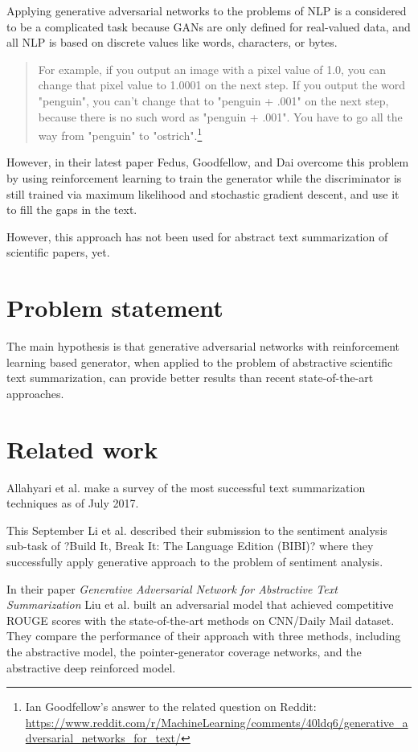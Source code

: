 \documentclass[sigplan]{acmart}
\begin{document}
Applying generative adversarial networks to the problems of NLP is a considered to be a complicated task because GANs are only defined for real-valued data, and all NLP is based on discrete values like words, characters, or bytes.

\begin{quote}
For example, if you output an image with a pixel value of 1.0, you can change that pixel value to 1.0001 on the next step. If you output the word "penguin", you can't change that to "penguin + .001" on the next step, because there is no such word as "penguin + .001". You have to go all the way from "penguin" to "ostrich".\footnote{Ian Goodfellow's answer to the related question on Reddit: \url{https://www.reddit.com/r/MachineLearning/comments/40ldq6/generative_adversarial_networks_for_text/}}
\end{quote}

However, in their latest paper Fedus, Goodfellow, and Dai\cite{fedus-18} overcome this problem by using reinforcement learning to train the generator while the discriminator is still trained via maximum likelihood and stochastic gradient descent, and use it to fill the gaps in the text.
 
However, this approach has not been used for abstract text summarization of scientific papers, yet.

\section{Problem statement}

The main hypothesis is that generative adversarial networks with reinforcement learning based generator, when applied to the problem of abstractive scientific text summarization, can provide better results than recent state-of-the-art approaches. 

\section{Related work}

Allahyari et al.\cite{allahyari-17} make a survey of the most successful text summarization techniques as of July 2017.

This September Li et al. \cite{li-cohn-17} described their submission to the sentiment analysis sub-task of ?Build It, Break It: The Language Edition (BIBI)? where they successfully apply generative approach to the problem of sentiment analysis.

In their paper \textit{Generative Adversarial Network for Abstractive Text Summarization} Liu et al.\cite{liu-17} built an adversarial model that achieved competitive ROUGE scores with the state-of-the-art methods on CNN/Daily Mail dataset. They compare the performance of their approach with three methods, including the abstractive model, the pointer-generator coverage networks, and the abstractive deep reinforced model.
\end{document}
